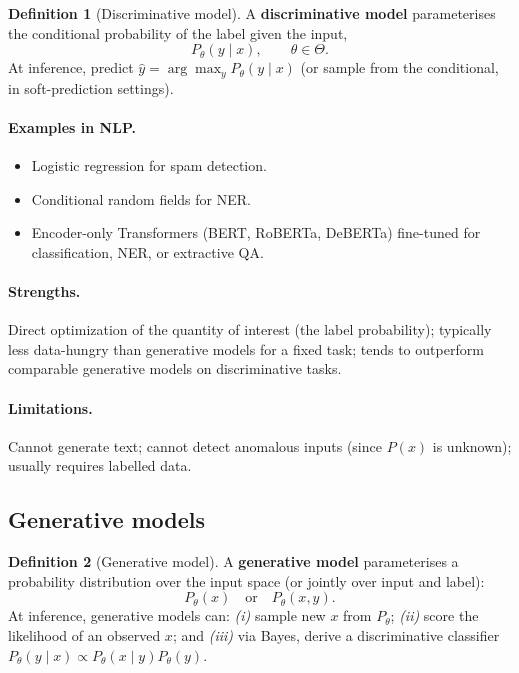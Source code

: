 \documentclass[12pt,a4paper]{report}
\theoremstyle{definition}
\newtheorem{definition}{Definition}[section]
\theoremstyle{remark}
\begin{document}
\begin{definition}[Discriminative model]
A \textbf{discriminative model} parameterises the conditional probability of the label given the input,
\[ P_\theta(y \mid x), \qquad \theta \in \Theta. \]
At inference, predict $\hat{y} = \arg\max_y P_\theta(y \mid x)$ (or sample from the conditional, in soft-prediction settings).
\end{definition}

\paragraph{Examples in NLP.}
\begin{itemize}
    \item Logistic regression for spam detection.
    \item Conditional random fields for NER.
    \item Encoder-only Transformers (BERT, RoBERTa, DeBERTa) fine-tuned for classification, NER, or extractive QA.
\end{itemize}

\paragraph{Strengths.} Direct optimization of the quantity of interest (the label probability); typically less data-hungry than generative models for a fixed task; tends to outperform comparable generative models on discriminative tasks.

\paragraph{Limitations.} Cannot generate text; cannot detect anomalous inputs (since $P(x)$ is unknown); usually requires labelled data.

\subsection{Generative models}

\begin{definition}[Generative model]
A \textbf{generative model} parameterises a probability distribution over the input space (or jointly over input and label):
\[ P_\theta(x) \quad\text{or}\quad P_\theta(x, y). \]
At inference, generative models can: \emph{(i)} sample new $x$ from $P_\theta$; \emph{(ii)} score the likelihood of an observed $x$; and \emph{(iii)} via Bayes, derive a discriminative classifier $P_\theta(y \mid x) \propto P_\theta(x \mid y) P_\theta(y)$.
\end{definition}
\end{document}
